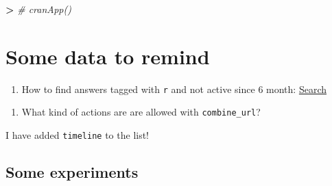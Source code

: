 \documentclass[]{book}
\newenvironment{Shaded}{\begin{snugshade}}{\end{snugshade}}
\newcommand{\StringTok}[1]{\textcolor[rgb]{0.31,0.60,0.02}{#1}}
\newcommand{\CommentTok}[1]{\textcolor[rgb]{0.56,0.35,0.01}{\textit{#1}}}
\newcommand{\OperatorTok}[1]{\textcolor[rgb]{0.81,0.36,0.00}{\textbf{#1}}}
\providecommand{\tightlist}{%
  \setlength{\itemsep}{0pt}\setlength{\parskip}{0pt}}
\theoremstyle{definition}
\theoremstyle{definition}
\theoremstyle{definition}
\theoremstyle{remark}
\begin{document}
\begin{Shaded}
\begin{Highlighting}[]
\OperatorTok{>}\StringTok{ }\CommentTok{# cranApp()}
\end{Highlighting}
\end{Shaded}

\section{Some data to remind}\label{some-data-to-remind}

\begin{enumerate}
\def\labelenumi{\arabic{enumi}.}
\tightlist
\item
  How to find answers tagged with \texttt{r} and not active since 6
  month:
  \href{https://stackoverflow.com/search?q=\%5Br\%5D+lastactive\%3A..6m+is\%3Aa}{Search}
\end{enumerate}

\begin{enumerate}
\def\labelenumi{\arabic{enumi}.}
\setcounter{enumi}{2}
\tightlist
\item
  What kind of actions are are allowed with \texttt{combine\_url}?
\end{enumerate}

I have added \texttt{timeline} to the list!

\subsection{Some experiments}\label{some-experiments}


\end{document}
